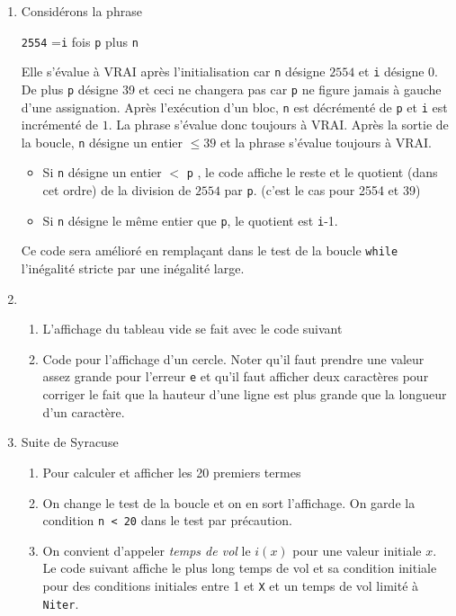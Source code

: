 \begin{enumerate}
\item Considérons la phrase
\begin{center}
  \og \texttt{2554} =\texttt{i} fois \texttt{p} plus \texttt{n} \fg
\end{center}
Elle s'évalue à VRAI après l'initialisation car \texttt{n} désigne $2554$ et \texttt{i} désigne $0$. De plus \texttt{p} désigne 39 et ceci ne changera pas car \texttt{p} ne figure jamais à gauche d'une assignation.\newline
Après l'exécution d'un bloc, \texttt{n} est décrémenté de \texttt{p} et \texttt{i} est incrémenté de $1$. La phrase s'évalue donc toujours à VRAI.\newline
Après la sortie de la boucle, \texttt{n} désigne un entier $\leq 39$ et la phrase s'évalue toujours à VRAI.
\begin{itemize}
  \item Si \texttt{n} désigne un entier $<$ \texttt{p} , le code affiche le reste et le quotient (dans cet ordre) de la division de $2554$ par \texttt{p}. (c'est le cas pour 2554 et 39)
  \item Si \texttt{n} désigne le même entier que \texttt{p}, le quotient est \texttt{i}-1. 
\end{itemize}
Ce code sera amélioré en remplaçant dans le test de la boucle \texttt{while} l'inégalité stricte par une inégalité large.

\item
\begin{enumerate}
  \item L'affichage du tableau vide se fait avec le code suivant


  \item Code pour l'affichage d'un cercle. Noter qu'il faut prendre une valeur assez grande pour l'erreur \texttt{e} et qu'il faut afficher deux caractères pour corriger le fait que la hauteur d'une ligne est plus grande que la longueur d'un caractère.

\end{enumerate}


\item Suite de Syracuse
\begin{enumerate}
  \item Pour calculer et afficher les 20 premiers termes

  
  \item On change le test de la boucle et on en sort l'affichage. On garde la condition \texttt{n < 20} dans le test par précaution.

  \item On convient d'appeler \emph{temps de vol} le $i(x)$ pour une valeur initiale $x$. Le code suivant affiche le plus long temps de vol et sa condition initiale pour des conditions initiales entre 1 et \texttt{X} et un temps de vol limité à \texttt{Niter}. 

\end{enumerate}

\end{enumerate}

